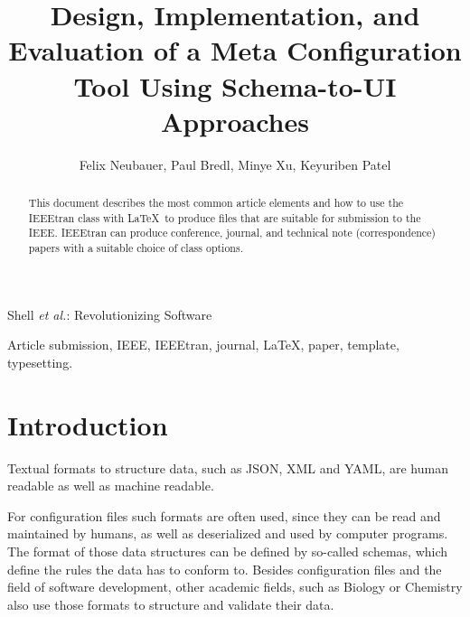\documentclass[lettersize,journal]{IEEEtran}
\begin{document}
\title{Design, Implementation, and Evaluation of a Meta Configuration Tool Using Schema-to-UI Approaches}
\author{Felix Neubauer, Paul Bredl, Minye Xu, Keyuriben Patel}

%
{Shell \MakeLowercase{\textit{et al.}}: Revolutionizing Software}


\maketitle

\begin{abstract}
This document describes the most common article elements and how to use the IEEEtran class with \LaTeX \ to produce files that are suitable for submission to the IEEE.  IEEEtran can produce conference, journal, and technical note (correspondence) papers with a suitable choice of class options. 
\end{abstract}

\begin{IEEEkeywords}
Article submission, IEEE, IEEEtran, journal, \LaTeX, paper, template, typesetting.
\end{IEEEkeywords}

\section{Introduction} %

Textual formats to structure data, such as JSON, XML and YAML, are human readable as well as machine readable.

For configuration files such formats are often used, since they can be read and maintained by humans, as well as deserialized and used by computer programs. 
The format of those data structures can be defined by so-called schemas, which define the rules the data has to conform to.
Besides configuration files and the field of software development, other academic fields, such as Biology or Chemistry also use those formats to structure and validate their data.
\end{document}
